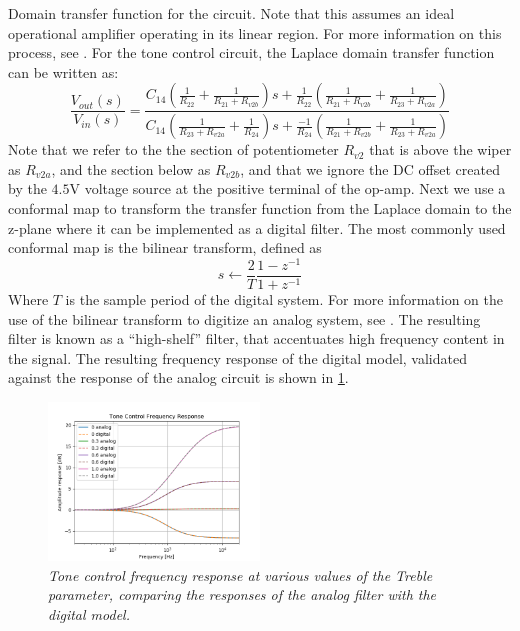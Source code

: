 \documentclass[twoside,a4paper]{article}
\begin{document}
Domain transfer function for the circuit. Note that this assumes an
ideal operational amplifier operating in its linear region. For more
information on this process, see \cite{Maby}. For the tone control
circuit, the Laplace domain transfer function can be written as:
\begin{equation}
    \frac{V_{out}(s)}{V_{in}(s)} = {\scriptscriptstyle \frac{C_{14}\left(\frac{1}{R_{22}} + \frac{1}{R_{21} + R_{v2b}}\right)s
    + \frac{1}{R_{22}}\left(\frac{1}{R_{21} + R_{v2b}} + \frac{1}{R_{23} + R_{v2a}}\right)}{
      C_{14}\left(\frac{1}{R_{23} + R_{v2a}} + \frac{1}{R_{24}}\right)s
    + \frac{-1}{R_{24}}\left(\frac{1}{R_{21} + R_{v2b}} + \frac{1}{R_{23} + R_{v2a}}\right)}}
\end{equation}
%
Note that we refer to the the section of potentiometer $R_{v2}$ that is
above the wiper as $R_{v2a}$, and the section below as $R_{v2b}$, and that
we ignore the DC offset created by the $4.5$V voltage source at the positive
terminal of the op-amp.
\newline\newline
Next we use a conformal map to transform the transfer function from the
Laplace domain to the z-plane where it can be implemented as a digital
filter. The most commonly used conformal map is the bilinear transform,
defined as
\begin{equation}
    s \leftarrow \frac{2}{T} \frac{1 - z^{-1}}{1 + z^{-1}}
\end{equation}
%
Where $T$ is the sample period of the digital system. For more
information on the use of the bilinear transform to digitize an
analog system, see \cite{pasp}. The resulting filter is known as a
``high-shelf'' filter, that accentuates high frequency content in
the signal. The resulting frequency response of the digital model,
validated against the response of the analog circuit is shown in
\cref{fig:ToneFreq}.
\begin{figure}
    \centering
    \includegraphics[width=0.5\textwidth]{ToneFreq.png}
    \caption{\label{fig:ToneFreq} {\it Tone control frequency response
    at various values of the Treble parameter, comparing the responses
    of the analog filter with the digital model.}}
\end{figure}
\end{document}
